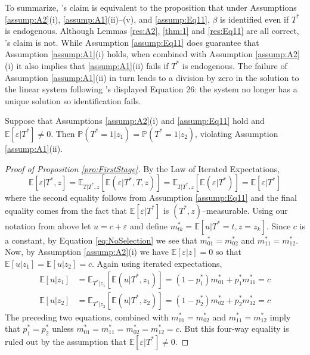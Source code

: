 To summarize, \citeauthor{Mahajan}'s claim is equivalent to the proposition that under Assumptions \ref{assump:A2}(i), \ref{assump:A1}(ii)--(v), and \ref{assump:Eq11}, $\beta$ is identified even if $T^*$ is endogenous.
Although Lemmas \ref{res:A2}, \ref{thm:1} and \ref{res:Eq11} are all correct, \citeauthor{Mahajan}'s claim is not.
While Assumption \ref{assump:Eq11} does guarantee that Assumption \ref{assump:A1}(i) holds, when combined with Assumption \ref{assump:A2}(i) it also implies that \ref{assump:A1}(ii) fails if $T^*$ is endogenous.
The failure of Assumption \ref{assump:A1}(ii) in turn leads to a division by zero in the solution to the linear system following \citeauthor{Mahajan}'s displayed Equation 26: the system no longer has a unique solution so identification fails. 
\begin{pro}
  \label{pro:FirstStage}
  Suppose that Assumptions \ref{assump:A2}(i) and \ref{assump:Eq11} hold and $\mathbb{E}[\varepsilon|T^*]\neq0$. Then $\mathbb{P}(T^*=1|z_1) = \mathbb{P}(T^*=1|z_2)$, violating Assumption \ref{assump:A1}(ii). 
\end{pro}
\begin{proof}[Proof of Proposition \ref{pro:FirstStage}]
  By the Law of Iterated Expectations,
  \begin{equation}
    \label{eq:NoSelection}
    \mathbb{E}[\varepsilon|T^*,z] = \mathbb{E}_{T|T^*,z}\left[\mathbb{E}\left(\varepsilon|T^*,T,z \right)  \right] = \mathbb{E}_{T|T^*,z}\left[\mathbb{E}\left(\varepsilon|T^* \right)  \right]
    = \mathbb{E}\left[ \varepsilon|T^* \right]
  \end{equation}
    where the second equality follows from Assumption \ref{assump:Eq11} and the final equality comes from the fact that $\mathbb{E}[\varepsilon|T^*]$ is $(T^*,z)$--measurable. 
  Using our notation from above let $u = c + \varepsilon$ and define $m^*_{tk}=\mathbb{E}[u|T^*=t,z=z_k]$.
  Since $c$ is a constant, by Equation \ref{eq:NoSelection} we see that $m^*_{01}=m^*_{02}$ and $m^*_{11}=m^*_{12}$.
  Now, by Assumption \ref{assump:A2}(i) we have $\mathbb{E}[\varepsilon|z]=0$ so that $\mathbb{E}[u|z_1]= \mathbb{E}[u|z_2] =c$.
  Again using iterated expectations, 
  \begin{align*}
    \mathbb{E}\left[u|z_1 \right] &= \mathbb{E}_{T^*|z_1}\left[\mathbb{E}\left( u|T^*,z_1 \right)  \right] = (1-p_1^*) m^*_{01} + p^*_1 m^*_{11}=c\\
    \mathbb{E}\left[u|z_2 \right] &= \mathbb{E}_{T^*|z_2}\left[\mathbb{E}\left( u|T^*,z_2 \right)  \right] = (1-p_2^*) m^*_{02} + p^*_2 m^*_{12}=c
  \end{align*}
  The preceding two equations, combined with $m^*_{01}=m^*_{02}$ and $m^*_{11}=m^*_{12}$ imply that $p_1^* = p_2^*$ unless $m^*_{01} = m^*_{11} = m^*_{02} = m^*_{12} = c$.
  But this four-way equality is ruled out by the assumption that $\mathbb{E}[\varepsilon|T^*]\neq0$. 
\end{proof}


